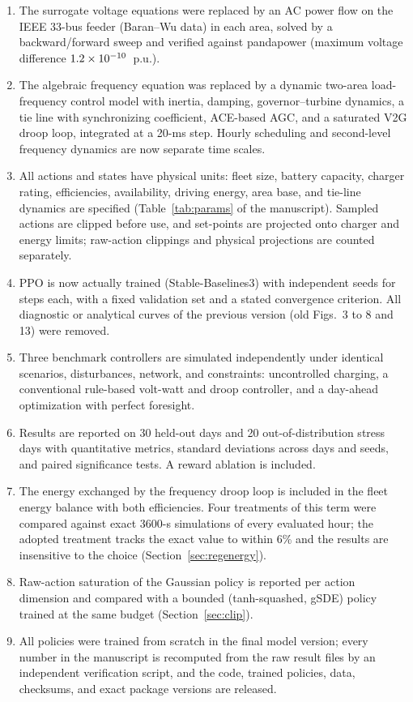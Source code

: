 \documentclass[10pt,a4paper]{article}
\begin{document}
\begin{enumerate}[leftmargin=1.5em]
\item The surrogate voltage equations were replaced by an AC power flow
on the IEEE 33-bus feeder (Baran--Wu data) in each area, solved by a
backward/forward sweep and verified against pandapower (maximum voltage
difference $1.2\times10^{-10}$~p.u.).
\item The algebraic frequency equation was replaced by a dynamic
two-area load-frequency control model with inertia, damping,
governor--turbine dynamics, a tie line with synchronizing coefficient,
ACE-based AGC, and a saturated V2G droop loop, integrated at a 20-ms
step. Hourly scheduling and second-level frequency dynamics are now
separate time scales.
\item All actions and states have physical units: fleet size, battery
capacity, charger rating, efficiencies, availability, driving energy,
area base, and tie-line dynamics are specified (Table~\ref{tab:params} of the
manuscript). Sampled actions are clipped before use, and set-points are
projected onto charger and energy limits; raw-action clippings and
physical projections are counted separately.
\item PPO is now actually trained (Stable-Baselines3) with \NSeed{}
independent seeds for \TrainSteps{} steps each, with a fixed validation
set and a stated convergence criterion. All diagnostic or analytical
curves of the previous version (old Figs.~3 to 8 and 13) were removed.
\item Three benchmark controllers are simulated independently under
identical scenarios, disturbances, network, and constraints:
uncontrolled charging, a conventional rule-based volt-watt and droop
controller, and a day-ahead optimization with perfect foresight.
\item Results are reported on 30 held-out days and 20
out-of-distribution stress days with quantitative metrics, standard
deviations across days and seeds, and paired significance tests. A
reward ablation is included.
\item The energy exchanged by the frequency droop loop is included in
the fleet energy balance with both efficiencies. Four treatments of
this term were compared against exact 3600-s simulations of every
evaluated hour; the adopted treatment tracks the exact value to within 6\% and the
results are insensitive to the choice (Section~\ref{sec:regenergy}).
\item Raw-action saturation of the Gaussian policy is reported per
action dimension and compared with a bounded (tanh-squashed, gSDE)
policy trained at the same budget (Section~\ref{sec:clip}).
\item All policies were trained from scratch in the final model
version; every number in the manuscript is recomputed from the raw
result files by an independent verification script, and the code,
trained policies, data, checksums, and exact package versions are
released.
\end{enumerate}
\end{document}
